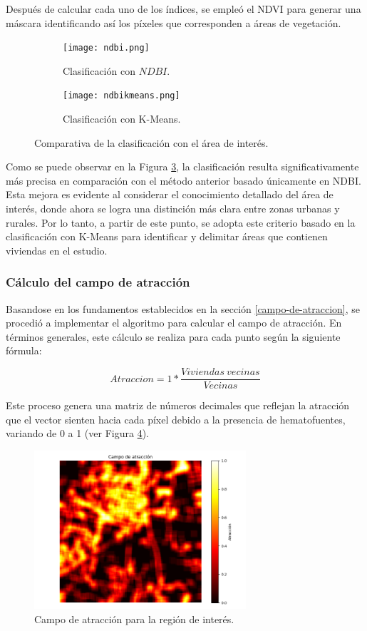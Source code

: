 Después de calcular cada uno de los índices, se empleó el NDVI para generar una máscara identificando así los píxeles que corresponden a áreas de vegetación.

\begin{figure}[H]
	\begin{subfigure}[b]{0.49\textwidth}
		\texttt{[image: ndbi.png]}
		\caption{Clasificación con $NDBI$.}
		\label{fig:ndbi-calculadora}
	\end{subfigure}
	\hfill
	\begin{subfigure}[b]{0.49\textwidth}
		\texttt{[image: ndbikmeans.png]}
		\caption{Clasificación con K-Means.}
		\label{fig:kmeans}
	\end{subfigure}
	\caption{Comparativa de la clasificación con el área de interés.}
	\label{fig:comparativa-ndbi-kmeans}
\end{figure}

Como se puede observar en la Figura \ref{fig:comparativa-ndbi-kmeans}, la clasificación resulta significativamente más precisa en comparación con el método anterior basado únicamente en NDBI. Esta mejora es evidente al considerar el conocimiento detallado del área de interés, donde ahora se logra una distinción más clara entre zonas urbanas y rurales. Por lo tanto, a partir de este punto, se adopta este criterio basado en la clasificación con K-Means para identificar y delimitar áreas que contienen viviendas en el estudio.

\subsubsection{Cálculo del campo de atracción}

Basandose en los fundamentos establecidos en la sección \ref{campo-de-atraccion}, se procedió a implementar el algoritmo para calcular el campo de atracción. En términos generales, este cálculo se realiza para cada punto según la siguiente fórmula:

$$Atraccion = 1 * \frac{Viviendas~vecinas}{Vecinas}$$

Este proceso genera una matriz de números decimales que reflejan la atracción que el vector sienten hacia cada píxel debido a la presencia de hematofuentes, variando de 0 a 1 (ver Figura \ref{fig:atraccion}).

\begin{figure}[H]
	\includegraphics[width=0.7\textwidth]{campoDeAtraccion.png}
	\centering
	\caption{Campo de atracción para la región de interés.}
	\label{fig:atraccion}
\end{figure}

